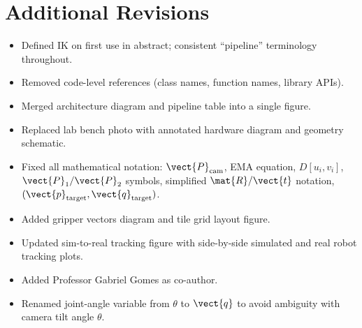 \documentclass[11pt]{article}
\begin{document}
\section*{Additional Revisions}

\begin{itemize}
\item Defined IK on first use in abstract; consistent ``pipeline'' terminology throughout.
\item Removed code-level references (class names, function names, library APIs).
\item Merged architecture diagram and pipeline table into a single figure.
\item Replaced lab bench photo with annotated hardware diagram and geometry schematic.
\item Fixed all mathematical notation: $\vect{P}_{\text{cam}}$, EMA equation, $D[u_i, v_i]$, $\vect{P}_1/\vect{P}_2$ symbols, simplified $\mat{R}/\vect{t}$ notation, $(\vect{p}_{\text{target}}, \vect{q}_{\text{target}})$.
\item Added gripper vectors diagram and tile grid layout figure.
\item Updated sim-to-real tracking figure with side-by-side simulated and real robot tracking plots.
\item Added Professor Gabriel Gomes as co-author.
\item Renamed joint-angle variable from $\theta$ to $\vect{q}$ to avoid ambiguity with camera tilt angle $\theta$.
\end{itemize}
\end{document}

